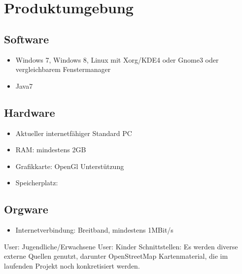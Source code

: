 
\chapter{Produktumgebung}
\section{Software}
\begin{itemize}
\item Windows 7, Windows 8, Linux mit Xorg/KDE4 oder Gnome3 oder vergleichbarem Fenstermanager
\item Java7 
\end{itemize}


\section{Hardware}
\begin{itemize}
\item Aktueller internetfähiger Standard PC
\item RAM: mindestens 2GB
\item Grafikkarte: OpenGl Unterstützung
\item Speicherplatz: 
\end{itemize}


\section{Orgware}
\begin{itemize}
\item Internetverbindung: Breitband, mindestens 1MBit/s
\end{itemize}

User: Jugendliche/Erwachsene
User: Kinder
Schnittstellen: Es  werden  diverse  externe  Quellen genutzt, darunter OpenStreetMap Kartenmaterial, die im laufenden Projekt noch konkretisiert werden.

